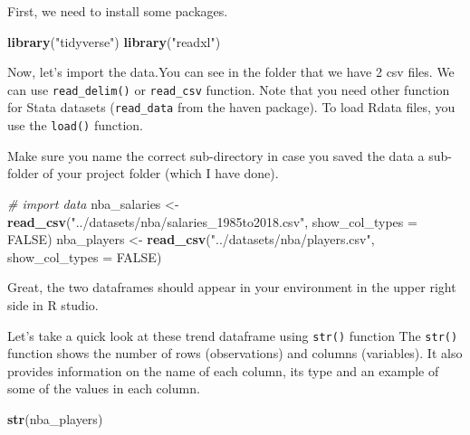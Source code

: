 \documentclass[
]{book}
\newenvironment{Shaded}{\begin{snugshade}}{\end{snugshade}}
\newcommand{\AttributeTok}[1]{\textcolor[rgb]{0.13,0.29,0.53}{#1}}
\newcommand{\CommentTok}[1]{\textcolor[rgb]{0.56,0.35,0.01}{\textit{#1}}}
\newcommand{\ConstantTok}[1]{\textcolor[rgb]{0.56,0.35,0.01}{#1}}
\newcommand{\FunctionTok}[1]{\textcolor[rgb]{0.13,0.29,0.53}{\textbf{#1}}}
\newcommand{\NormalTok}[1]{#1}
\newcommand{\OtherTok}[1]{\textcolor[rgb]{0.56,0.35,0.01}{#1}}
\newcommand{\StringTok}[1]{\textcolor[rgb]{0.31,0.60,0.02}{#1}}
\begin{document}
First, we need to install some packages.

\begin{Shaded}
\begin{Highlighting}[]
\FunctionTok{library}\NormalTok{(}\StringTok{"tidyverse"}\NormalTok{)}
\FunctionTok{library}\NormalTok{(}\StringTok{"readxl"}\NormalTok{)}
\end{Highlighting}
\end{Shaded}

Now, let's import the data.You can see in the folder that we have 2 csv files.
We can use \texttt{read\_delim()} or \texttt{read\_csv} function. Note that you need other function for Stata datasets (\texttt{read\_data} from the haven package). To load Rdata files, you use the \texttt{load()} function.

Make sure you name the correct sub-directory in case you saved the data a sub-folder of your project folder (which I have done).

\begin{Shaded}
\begin{Highlighting}[]
\CommentTok{\# import data }
\NormalTok{nba\_salaries }\OtherTok{\textless{}{-}} \FunctionTok{read\_csv}\NormalTok{(}\StringTok{"../datasets/nba/salaries\_1985to2018.csv"}\NormalTok{, }\AttributeTok{show\_col\_types =} \ConstantTok{FALSE}\NormalTok{)}
\NormalTok{nba\_players }\OtherTok{\textless{}{-}} \FunctionTok{read\_csv}\NormalTok{(}\StringTok{"../datasets/nba/players.csv"}\NormalTok{, }\AttributeTok{show\_col\_types =} \ConstantTok{FALSE}\NormalTok{)}
\end{Highlighting}
\end{Shaded}

Great, the two dataframes should appear in your environment in the upper right side in R studio.

Let's take a quick look at these trend dataframe using \texttt{str()} function The \texttt{str()} function shows the number of rows (observations) and columns (variables). It also provides information on the name of each column, its type and an example of some of the values in each column.

\begin{Shaded}
\begin{Highlighting}[]
\FunctionTok{str}\NormalTok{(nba\_players)}
\end{Highlighting}
\end{Shaded}
\end{document}
